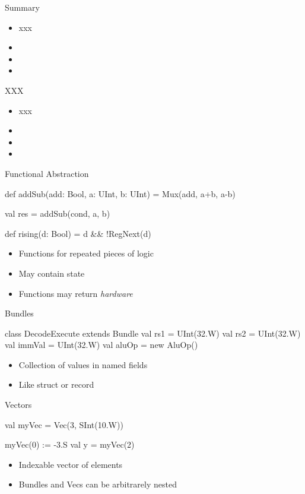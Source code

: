\begin{frame}[fragile]{Summary}
\begin{itemize}
\item xxx
\item
\item
\item
\end{itemize}
\end{frame}

\begin{frame}[fragile]{XXX}
\begin{itemize}
\item xxx
\item
\item
\item
\end{itemize}
\end{frame}

\begin{frame}[fragile]{Functional Abstraction}
\begin{chisel}
  def addSub(add: Bool, a: UInt, b: UInt) =
    Mux(add, a+b, a-b)

  val res = addSub(cond, a, b)
  
  def rising(d: Bool) = d && !RegNext(d)
\end{chisel}
\begin{itemize}
\item Functions for repeated pieces of logic
\item May contain state
\item Functions may return \emph{hardware}
\end{itemize}
\end{frame}


\begin{frame}[fragile]{Bundles}
\begin{chisel}
class DecodeExecute extends Bundle {
  val rs1 = UInt(32.W)
  val rs2 = UInt(32.W)
  val immVal = UInt(32.W)
  val aluOp = new AluOp()
}
\end{chisel}
\begin{itemize}
\item Collection of values in named fields 
\item Like struct or record
\end{itemize}
\end{frame}

\begin{frame}[fragile]{Vectors}
\begin{chisel}
val myVec = Vec(3, SInt(10.W))

myVec(0) := -3.S
val y = myVec(2)
\end{chisel}
\begin{itemize}
\item Indexable vector of elements
\item Bundles and Vecs can be arbitrarely nested
\end{itemize}
\end{frame}





